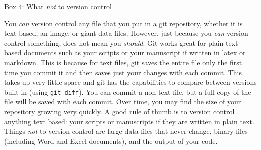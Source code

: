 Box 4: What \textit{not} to version control

You \textit{can} version control any file that you put in a git repository, whether it is text-based, an image, or giant data files. However, just because you \textit{can} version control something, does not mean you \textit{should}. Git works great for plain text based documents such as your scripts or your manuscript if written in latex or markdown. This is because for text files, git saves the entire file only the first time you commit it and then saves just your changes with each commit. This takes up very little space and git has the capabilities to compare between versions built in (using \verb|git diff|). You can commit a non-text file, but a full copy of the file will be saved with each commit. Over time, you may find the size of your repository growing very quickly. A good rule of thumb is to version control anything text based: your scripts or manuscripts if they are written in plain text. Things \textit{not} to version control are large data files that never change, binary files (including Word and Excel documents), and the output of your code. 
